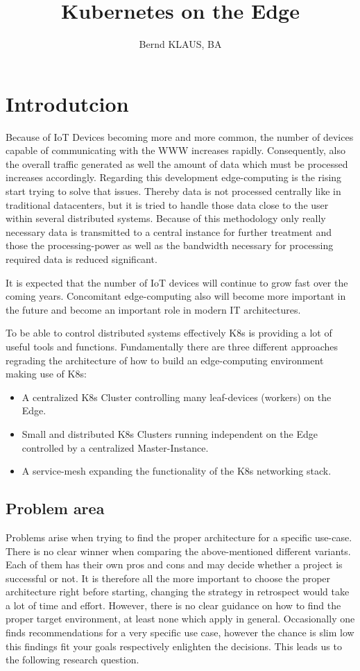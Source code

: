 \documentclass[MSC,Master,english]{twbook}%
\title{Kubernetes on the Edge}
\author{Bernd KLAUS, BA}
\begin{document}
\maketitle
\chapter{Introdutcion}
\label{chap:introduction}
Because of \ac{IoT} Devices becoming more and more common, the number of devices capable of communicating with the \ac{WWW} increases rapidly. Consequently, also the overall traffic generated as well the amount of data which must be processed increases accordingly. Regarding this development edge-computing is the rising start trying to solve that issues. Thereby data is not processed centrally like in traditional datacenters, but it is tried to handle those data close to the user within several distributed systems. Because of this methodology only really necessary data is transmitted to a central instance for further treatment and those the processing-power as well as the bandwidth necessary for processing required data is reduced significant. \par It is expected that the number of IoT devices will continue to grow fast\cite{SotE21} over the coming years. Concomitant edge-computing also will become more important in the future and become an important role in modern \ac{IT} architectures. \par To be able to control distributed systems effectively \ac{K8s} is providing a lot of useful tools and functions. Fundamentally there are three different approaches regrading the architecture of how to build an edge-computing environment making use of \ac{K8s}:

\begin{itemize}
    \label{item:architecture}
    \item A centralized \ac{K8s} Cluster controlling many leaf-devices (workers) on the Edge.
    \item Small and distributed \ac{K8s} Clusters running independent on the Edge controlled by a
    centralized Master-Instance.
    \item A service-mesh expanding the functionality of the \ac{K8s} networking stack.
\end{itemize}

\section{Problem area}
Problems arise when trying to find the proper architecture for a specific use-case. There is no clear winner when comparing the above-mentioned different variants. Each of them  has their own pros and cons and may decide whether a project is successful or not. It is therefore all the more important to choose the proper architecture right before starting, changing the strategy in retrospect would take a lot of time and effort. However, there is no clear guidance on how to find the proper target environment, at least none which apply in general. Occasionally one finds recommendations for a very specific use case, however the chance is slim low this findings fit your goals respectively enlighten the decisions. This leads us to the following research question.
\end{document}
